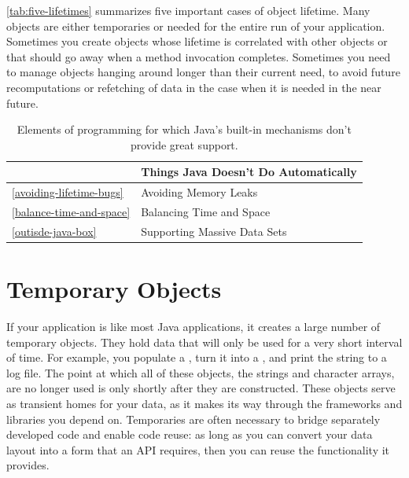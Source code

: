 \autoref{tab:five-lifetimes} summarizes five important cases of object lifetime.
Many objects are either temporaries or needed for
the entire run of your application. Sometimes you create objects whose lifetime
is correlated with other objects or that should go away when a method invocation
completes. Sometimes you need to manage objects hanging around longer than their
current need, to avoid future recomputations or refetching of data in the case
when it is needed in the near future. 


\begin{table}
\centering
	\begin{tabular}{ll} \toprule
    	& Things Java Doesn't Do Automatically \\ \midrule
    	\autoref{avoiding-lifetime-bugs} & {Avoiding Memory Leaks} \\
    	\autoref{balance-time-and-space} & {Balancing Time and Space} \\
    	\autoref{outisde-java-box} & {Supporting Massive Data Sets}  	\\
        \bottomrule
    \end{tabular}
	\caption{Elements of programming for which Java's built-in mechanisms don't
	provide great support.}
	\label{tab:things-java-does-not-do}
\end{table}


\section{Temporary Objects}
\label{temporary-lifetime}

If your application is like most Java applications, it creates a large number of
temporary objects. They hold data that will only be used for a very short
interval of time. For example, you populate a , turn it into
a , and print the string to a log file. The point at which all of
these objects, the strings and character arrays, are no longer used is only
shortly after they are constructed. These objects serve as transient homes for
your data, as it makes its way through the frameworks and libraries you depend
on. Temporaries are often necessary to bridge separately developed code and
enable code reuse: as long as you can convert your data layout into a form that
an API requires, then you can reuse the functionality it provides.

